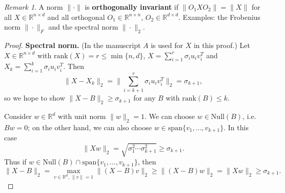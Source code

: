 \documentclass[
  letterpaper,
  DIV=11,
  numbers=noendperiod]{scrreprt}
\theoremstyle{definition}
\theoremstyle{plain}
\theoremstyle{plain}
\theoremstyle{definition}
\theoremstyle{plain}
\theoremstyle{plain}
\theoremstyle{remark}
\newtheorem*{remark}{Remark}
\begin{document}
\begin{remark}
A norm \(\|\cdot\|\) is \textbf{orthogonally invariant} if
\(\|O_1 X O_2\| = \|X\|\) for all \(X \in \mathbb{R}^{n \times d}\) and
all orthogonal \(O_1 \in \mathbb{R}^{n \times n}\),
\(O_2 \in \mathbb{R}^{d \times d}\). Examples: the Frobenius norm
\(\|\cdot\|_F\) and the spectral norm \(\|\cdot\|_2\).
\end{remark}

\begin{proof}
\textbf{Spectral norm.} (In the manuscript \(A\) is used for \(X\) in
this proof.) Let \(X \in \mathbb{R}^{n \times d}\) with
\(\mathrm{rank}(X) = r \le \min\{n,d\}\),
\(X = \sum_{i=1}^{r} \sigma_i u_i v_i^T\) and
\(X_k = \sum_{i=1}^{k} \sigma_i u_i v_i^T\). Then \[
\|X - X_k\|_2 = \Big\|\sum_{i=k+1}^{r} \sigma_i u_i v_i^T\Big\|_2 = \sigma_{k+1},
\] so we hope to show \(\|X - B\|_2 \ge \sigma_{k+1}\) for any \(B\)
with \(\mathrm{rank}(B) \le k\).

Consider \(w \in \mathbb{R}^d\) with unit norm \(\|w\|_2 = 1\). We can
choose \(w \in \mathrm{Null}(B)\), i.e.~\(Bw = 0\); on the other hand,
we can also choose \(w \in \mathrm{span}\{v_1, \dots, v_{k+1}\}\). In
this case \[
\|X w\|_2 = \sqrt{\sigma_1^2 \cdots \sigma_{k+1}^2} \ge \sigma_{k+1} .
\] Thus if
\(w \in \mathrm{Null}(B) \cap \mathrm{span}\{v_1, \dots, v_{k+1}\}\),
then \[
\|X - B\|_2 = \max_{v \in \mathbb{R}^d,\, \|v\|=1} \|(X-B)v\|_2 \ge \|(X-B)w\|_2 = \|X w\|_2 \ge \sigma_{k+1} .
\]
\end{proof}
\end{document}
